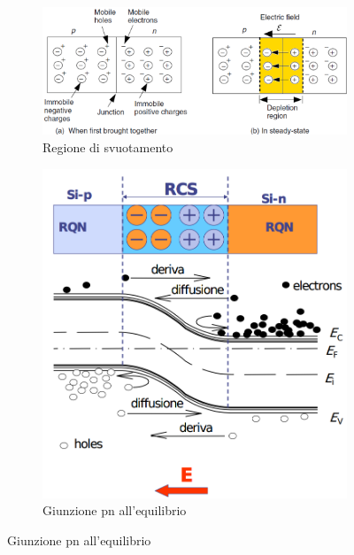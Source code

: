 \documentclass[
]{book}
\begin{document}
\begin{figure}[H]
\centering
\begin{subfigure}[t]{0.6\textwidth}
\includegraphics[width=\textwidth,height=\textheight,keepaspectratio]{immagini/1.png}
\caption{Regione di svuotamento}
\end{subfigure}
\begin{subfigure}[t]{0.3\textwidth}
\includegraphics[width=\textwidth,height=\textheight,keepaspectratio]{immagini/pn_equilibrio.png}
\caption{Giunzione pn all'equilibrio}
\end{subfigure}
\end{figure}
\end{document}
